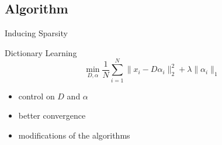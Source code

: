 \documentclass[11pt]{beamer}
\begin{document}
	\subsection{Algorithm}
	
	\begin{frame}{Inducing Sparsity}
		\begin{block}{Dictionary Learning}
			\begin{equation*}
				\min_{D, \alpha} \frac{1}{N} \sum_{i=1}^N \|x_i - D \alpha_i \|_2^2 + \lambda \| 
				\alpha_i \|_1
			\end{equation*}
			\begin{itemize}
				\item control on $D$ and $\alpha$
				\item better convergence
				\item modifications of the algorithms
			\end{itemize}
		\end{block}
	\end{frame}
	
	
	
\end{document}
